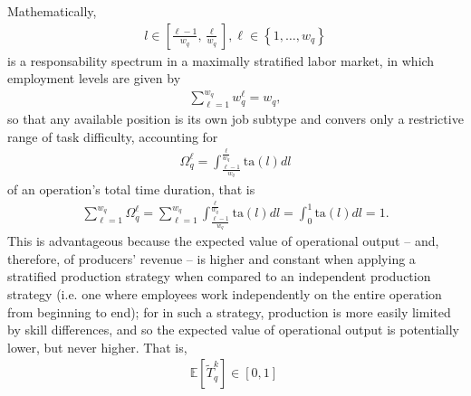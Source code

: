 \documentclass[hidelinks, nonatbib]{elsarticle}
\begin{document}
\begin{enumerate}
\begin{enumerate}
\begin{enumerate}
            Mathematically,
            \begin{gather}
                l \in \left[
                \frac{\ell - 1}{w_q}
                ,
                \frac{\ell}{w_q}
                \right]
                ,
                \ell \in 
                \left\{
                    1, \dots, w_q
                \right\}
            \end{gather}
            is a responsability spectrum in a maximally stratified labor market, in which employment levels are given by
            \begin{gather}
                \sum_{\ell=1}^{w_q}
                w_{q}^{\ell}
                =
                w_q
                ,
            \end{gather}
            so that any available position is its own job subtype and convers only a restrictive range of task difficulty, accounting for
            \begin{gather}
                \Omega_{q}^{\ell} = 
                \int_{
                    \frac{\ell - 1}{w_q}
                }^{
                    \frac{\ell}{w_q}
                }
                \text{ta}(l)dl
            \end{gather}
            of an operation's total time duration, that is
            \begin{gather}
                \sum_{\ell=1}^{w_q}
                \Omega_{q}^{\ell} 
                = 
                \sum_{\ell=1}^{w_q}
                \int_{
                    \frac{\ell - 1}{w_q}
                }^{
                    \frac{\ell}{w_q}
                }
                \text{ta}(l)dl
                =
                \int_{0}^{1}
                \text{ta}(l)dl
                =
                1
                .
            \end{gather}
            This is advantageous because the expected value of operational output -- and, therefore, of producers' revenue -- is higher and constant when applying a stratified production strategy when compared to an independent production strategy (i.e. one where employees work independently on the entire operation from beginning to end); for in such a strategy, production is more easily limited by skill differences, and so the expected value of operational output is potentially lower, but never higher. That is, 
            \begin{gather}
                \mathbb{E}[
                    \tilde{T}_{q}^{k}
                ]
                \in [0,1]
                \

\end{gather}
\end{enumerate}
\end{enumerate}
\end{enumerate}
\end{document}
